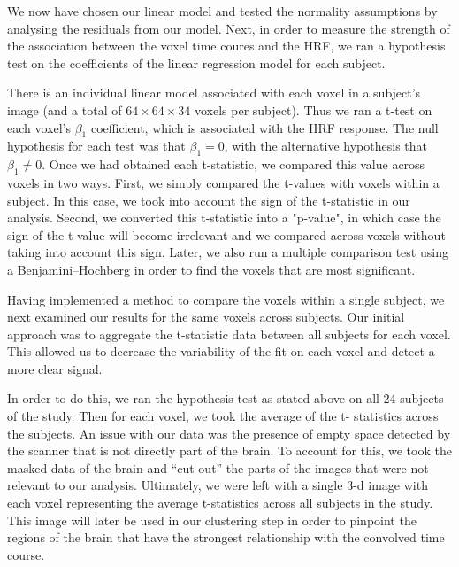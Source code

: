 
\par \indent We now have chosen our linear model and tested the normality
assumptions by analysing the residuals from our model. Next, in order to
measure the strength of the association between the voxel time coures and the
HRF, we ran a hypothesis test on the coefficients of the linear regression
model for each subject.

\par There is an individual linear model associated with each voxel in a
subject’s image (and a total of $64 \times 64 \times 34$ voxels per subject).
Thus we ran a t-test on each voxel's $\beta_1$ coefficient, which is associated
with the HRF response. The null hypothesis for each test was that $ \beta_1=
0$, with the alternative hypothesis that $\beta_1 \neq 0$. Once we had obtained
each t-statistic, we compared this value across voxels in two ways. First, we
simply compared the t-values with voxels within a subject. In this case, we
took into account the sign of the t-statistic in our analysis. Second, we
converted this t-statistic into a "p-value", in which case the sign of the
t-value will become irrelevant and we compared across voxels without taking
into account this sign. Later, we also run a multiple comparison test using a
Benjamini–Hochberg in order to find the voxels that are most significant.

\par Having implemented a method to compare the voxels within a single subject,
we next examined our results for the same voxels across subjects. Our initial
approach was to aggregate the t-statistic data between all subjects for each
voxel. This allowed us to decrease the variability of the fit on each voxel and
detect a more clear signal.

\par In order to do this, we ran the hypothesis test as stated above on all 24
subjects of the study. Then for each voxel, we took the average of the t-
statistics across the subjects. An issue with our data was the presence of
empty space detected by the scanner that is not directly part of the brain. To
account for this, we took the masked data of the brain and ``cut out'' the
parts of the images that were not relevant to our analysis. Ultimately, we were
left with a single 3-d image with each voxel representing the average
t-statistics across all subjects in the study. This image will later be used in
our clustering step in order to pinpoint the regions of the brain that have the
strongest relationship with the convolved time course.
